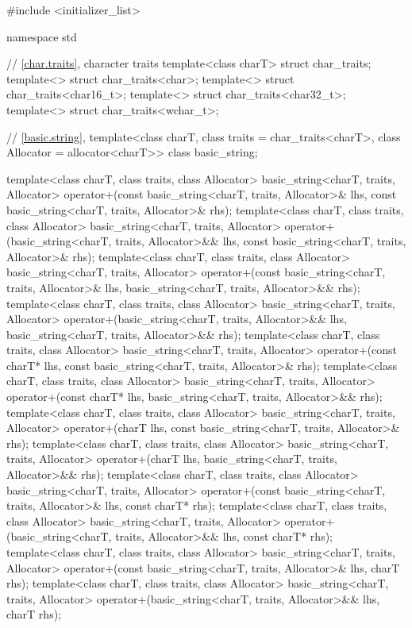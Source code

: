 \begin{codeblock}
#include <initializer_list>

namespace std {
  // \ref{char.traits}, character traits
  template<class charT> struct char_traits;
  template<> struct char_traits<char>;
  template<> struct char_traits<char16_t>;
  template<> struct char_traits<char32_t>;
  template<> struct char_traits<wchar_t>;

  // \ref{basic.string}, 
  template<class charT, class traits = char_traits<charT>, class Allocator = allocator<charT>>
    class basic_string;

  template<class charT, class traits, class Allocator>
    basic_string<charT, traits, Allocator>
      operator+(const basic_string<charT, traits, Allocator>& lhs,
                const basic_string<charT, traits, Allocator>& rhs);
  template<class charT, class traits, class Allocator>
    basic_string<charT, traits, Allocator>
      operator+(basic_string<charT, traits, Allocator>&& lhs,
                const basic_string<charT, traits, Allocator>& rhs);
  template<class charT, class traits, class Allocator>
    basic_string<charT, traits, Allocator>
      operator+(const basic_string<charT, traits, Allocator>& lhs,
                basic_string<charT, traits, Allocator>&& rhs);
  template<class charT, class traits, class Allocator>
    basic_string<charT, traits, Allocator>
      operator+(basic_string<charT, traits, Allocator>&& lhs,
                basic_string<charT, traits, Allocator>&& rhs);
  template<class charT, class traits, class Allocator>
    basic_string<charT, traits, Allocator>
      operator+(const charT* lhs,
                const basic_string<charT, traits, Allocator>& rhs);
  template<class charT, class traits, class Allocator>
    basic_string<charT, traits, Allocator>
      operator+(const charT* lhs,
                basic_string<charT, traits, Allocator>&& rhs);
  template<class charT, class traits, class Allocator>
    basic_string<charT, traits, Allocator>
      operator+(charT lhs,
                const basic_string<charT, traits, Allocator>& rhs);
  template<class charT, class traits, class Allocator>
    basic_string<charT, traits, Allocator>
      operator+(charT lhs,
                basic_string<charT, traits, Allocator>&& rhs);
  template<class charT, class traits, class Allocator>
    basic_string<charT, traits, Allocator>
      operator+(const basic_string<charT, traits, Allocator>& lhs,
                const charT* rhs);
  template<class charT, class traits, class Allocator>
    basic_string<charT, traits, Allocator>
      operator+(basic_string<charT, traits, Allocator>&& lhs,
                const charT* rhs);
  template<class charT, class traits, class Allocator>
    basic_string<charT, traits, Allocator>
      operator+(const basic_string<charT, traits, Allocator>& lhs,
                charT rhs);
  template<class charT, class traits, class Allocator>
    basic_string<charT, traits, Allocator>
      operator+(basic_string<charT, traits, Allocator>&& lhs,
                charT rhs);

}
\end{codeblock}
